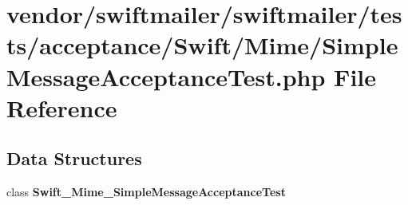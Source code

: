 \section{vendor/swiftmailer/swiftmailer/tests/acceptance/\+Swift/\+Mime/\+Simple\+Message\+Acceptance\+Test.php File Reference}
\label{_simple_message_acceptance_test_8php}
\subsection*{Data Structures}
\begin{DoxyCompactItemize}
\item 
class {\bf Swift\+\_\+\+Mime\+\_\+\+Simple\+Message\+Acceptance\+Test}
\end{DoxyCompactItemize}
